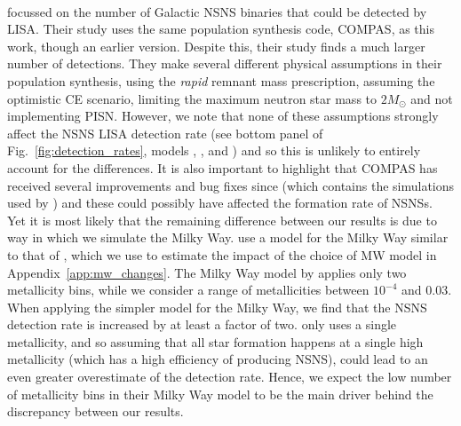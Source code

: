 \paragraph{\citet{Lau+2020}} focussed on the number of Galactic NSNS binaries that could be detected by LISA. Their study uses the same population synthesis code, COMPAS, as this work, though an earlier version. Despite this, their study finds a much larger number of detections. They make several different physical assumptions in their population synthesis, using the \citet{Fryer+2012} \textit{rapid} remnant mass prescription, assuming the optimistic CE scenario, limiting the maximum neutron star mass to $2 \unit{M_{\odot}}$ and not implementing PISN. However, we note that none of these assumptions strongly affect the NSNS LISA detection rate (see bottom panel of Fig.~\ref{fig:detection_rates}, models \modOpt{}, \modRapid{}, \modNSLow{} and \modNoPISN{}) and so this is unlikely to entirely account for the differences. It is also important to highlight that COMPAS has received several improvements and bug fixes since \citet{Vigna-Gomez+2018} (which contains the simulations used by \citealt{Lau+2020}) and these could possibly have affected the formation rate of NSNSs.
%
Yet it is most likely that the remaining difference between our results is due to way in which we simulate the Milky Way. \citet{Lau+2020} use a model for the Milky Way similar to that of \citet{Breivik+2020}, which we use to estimate the impact of the choice of MW model in Appendix~\ref{app:mw_changes}. The Milky Way model by \cite{Breivik+2020} applies only two metallicity bins, while we consider a range of metallicities between $10^{-4}$ and $0.03$. When applying the simpler model for the Milky Way, we find that the NSNS detection rate is increased by at least a factor of two. \citet{Lau+2020} only uses a single metallicity, and so assuming that all star formation happens at a single high metallicity (which has a high efficiency of producing NSNS), could lead to an even greater overestimate of the detection rate.  Hence, we expect the low number of metallicity bins in their Milky Way model to be the main driver behind the discrepancy between our results.

